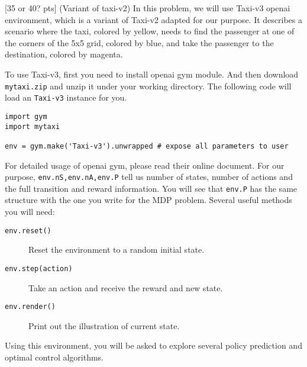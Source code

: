  [35 or 40? pts] (Variant of taxi-v2)
In this problem, we will use Taxi-v3 openai environment, which is a variant
of Taxi-v2 adapted for our purpose. It describes a scenario where the taxi,
colored by yellow, needs to find the passenger at one of the corners of
the 5x5 grid, colored by blue, and take the passenger to the destination,
colored by magenta.

To use Taxi-v3, first you need to install openai gym module. And then
download \texttt{mytaxi.zip} and unzip it under your working directory.
The following code will load an \texttt{Taxi-v3} instance for you.
\begin{verbatim}
import gym
import mytaxi

env = gym.make('Taxi-v3').unwrapped # expose all parameters to user
\end{verbatim}
For detailed usage of openai gym, please read their online document.
For our purpose, \texttt{env.nS,env.nA,env.P} tell us number of states,
number of actions and the full transition and reward information. You will
see that \texttt{env.P} has the same structure with the one you write for
the MDP problem. Several useful methods you will need:
\begin{description}
  \item[\texttt{env.reset()}] Reset the environment to a random initial
  state.
  \item[\texttt{env.step(action)}] Take an action and receive the reward
  and new state.
  \item[\texttt{env.render()}] Print out the illustration of current state.
\end{description}
Using this environment, you will be asked to explore several policy prediction
and optimal control algorithms.

